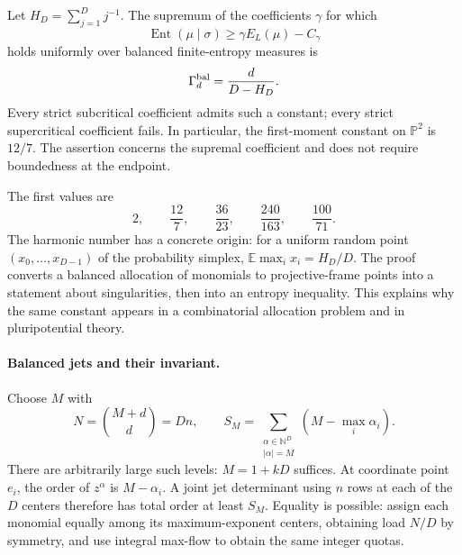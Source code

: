 \begin{theorem}
\label{geo:sharp}
Let \(H_D=\sum_{j=1}^D j^{-1}\). The supremum of the coefficients
\(\gamma\) for which
\[
 \operatorname{Ent}(\mu\mid\sigma)\ge\gamma E_L(\mu)-C_\gamma
\]
holds uniformly over balanced finite-entropy measures is
\begin{equation}
 \Gamma_d^{\rm bal}=\frac{d}{D-H_D}.
 \label{geo:gamma}
\end{equation}
Every strict subcritical coefficient admits such a constant; every strict
supercritical coefficient fails. In particular, the first-moment constant
on \(\mathbb P^2\) is \(12/7\). The assertion concerns the supremal
coefficient and does not require boundedness at the endpoint.
\end{theorem}

The first values are
\[
 2,\qquad \frac{12}{7},\qquad \frac{36}{23},\qquad
 \frac{240}{163},\qquad \frac{100}{71}.
\]
The harmonic number has a concrete origin: for a uniform random point
\((x_0,\ldots,x_{D-1})\) of the probability simplex,
\(\mathbb E\max_i x_i=H_D/D\). The proof converts a balanced allocation of
monomials to projective-frame points into a statement about singularities,
then into an entropy inequality. This explains why the same constant
appears in a combinatorial allocation problem and in pluripotential theory.


\paragraph{Balanced jets and their invariant.}
Choose \(M\) with
\[
 N=\binom{M+d}{d}=Dn,\qquad
 S_M=\sum_{\substack{\alpha\in\mathbb N^D\\|\alpha|=M}}
                  (M-\max_i\alpha_i).
\]
There are arbitrarily large such levels: \(M=1+kD\) suffices. At coordinate
point \(e_i\), the order of \(z^\alpha\) is \(M-\alpha_i\). A joint jet
determinant using \(n\) rows at each of the \(D\) centers therefore has
total order at least \(S_M\). Equality is possible: assign each monomial
equally among its maximum-exponent centers, obtaining load \(N/D\) by
symmetry, and use integral max-flow to obtain the same integer quotas.

